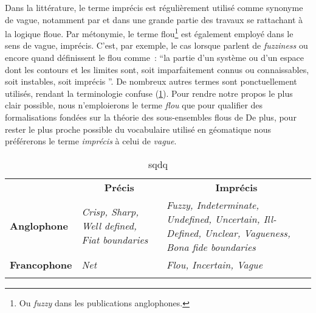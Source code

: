 Dans la littérature, le terme imprécis est régulièrement utilisé comme
synonyme de vague, notamment par \textcite{Zadeh1965} et dans une
grande partie des travaux se rattachant à la logique floue. Par
métonymie, le terme flou\footnote{Ou \emph{fuzzy} dans les
  publications anglophones.} est également employé dans le sens de
vague, imprécis. C’est, par exemple, le cas lorsque
\textcite{Lagacherie1996} parlent de \emph{fuzziness} ou encore quand
\textcite[218]{Brunet1992} définissent le flou comme : \enquote{la
  partie d’un système ou d’un espace dont les contours et les limites
  sont, soit imparfaitement connus ou connaissables, soit instables,
  soit imprécis \textelp{}}. De nombreux autres termes sont
ponctuellement utilisés, rendant la terminologie confuse
(\ref{tab:1}). Pour rendre notre propos le plus clair possible, nous
n’emploierons le terme \emph{flou} que pour qualifier des
formalisations fondées sur la théorie des sous-ensembles flous de
 De plus, pour rester le plus proche possible du
vocabulaire utilisé en géomatique nous préférerons le terme
\emph{imprécis} à celui de \emph{vague}.

\begin{table}
  \centering
  \begin{tabular}{lm{5cm}m{5cm}}
    \firsthline
    &\multicolumn{1}{c}{\textbf{Précis}} & \multicolumn{1}{c}{\textbf{Imprécis}}\\
    \cline{2-3}
    \textbf{Anglophone}&\emph{Crisp, Sharp, Well defined, Fiat boundaries} &\emph{Fuzzy, Indeterminate, Undefined, Uncertain, Ill-Defined, Unclear, Vagueness, Bona fide boundaries}\\
    \textbf{Francophone}&\emph{Net}&\emph{Flou, Incertain, Vague}\\
    \lasthline
  \end{tabular}
  \caption{sqdq}
  \label{tab:1}
\end{table}

